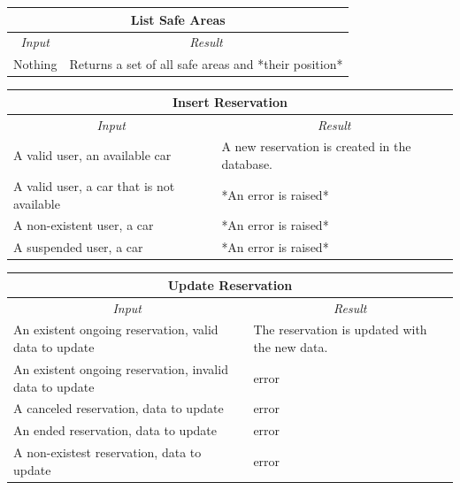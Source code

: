 \documentclass[english]{article}
\begin{document}
\begin{center}

	\begin{tabular}{ | p{6cm} | p{6cm} | }
		\hline 
		\multicolumn{2}{|c|}{\textbf{List Safe Areas}} \\
		\hline
		\multicolumn{1}{|c|}{\textit{Input}} & \multicolumn{1}{c|}{\textit{Result}} \\
		\hline
		Nothing & Returns a set of all safe areas and *their position* \\
		\hline
	\end{tabular}
\end{center}

\begin{center}

	\begin{tabular}{ | p{6cm} | p{6cm} | }
		\hline 
		\multicolumn{2}{|c|}{\textbf{Insert Reservation}} \\
		\hline
		\multicolumn{1}{|c|}{\textit{Input}} & \multicolumn{1}{c|}{\textit{Result}} \\
		\hline
		A valid user, an available car & A new reservation is created in the database. \\
		\hline
		A valid user, a car that is not available & *An error is raised* \\
		\hline
		A non-existent user, a car & *An error is raised* \\
		\hline
		A suspended user, a car & *An error is raised* \\
		\hline
	\end{tabular}
\end{center}

\begin{center}

	\begin{tabular}{ | p{6cm} | p{6cm} | }
		\hline
		\multicolumn{2}{|c|}{\textbf{Update Reservation}} \\
		\hline
		\multicolumn{1}{|c|}{\textit{Input}} & \multicolumn{1}{c|}{\textit{Result}} \\
		\hline
		An existent ongoing reservation, valid data to update & The reservation is updated with the new data. \\
		\hline
		An existent ongoing reservation, invalid data to update & error \\
		\hline
		A canceled reservation, data to update & error \\
		\hline
		An ended reservation, data to update & error \\
		\hline
		A non-existest reservation, data to update & error \\
		\hline
	\end{tabular}
\end{center}
\end{document}
